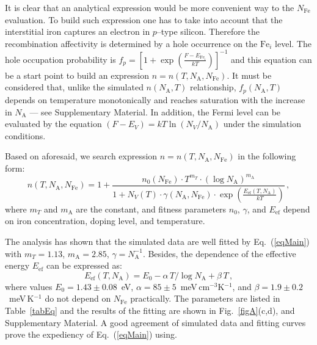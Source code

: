 \documentclass [sort&compress] {elsarticle}
\begin{document}
It is clear that an analytical expression would be more convenient way to the $N_\mathrm{Fe}$ evaluation.
To build such expression one has to take into account that the interstitial iron captures an electron in $p$--type silicon.
Therefore the recombination affectivity is determined by a hole occurrence  on the $\mathrm{Fe}_i$ level.
The hole occupation probability is $f_p=\left[1+\exp\left(\frac{F-E_{\mathrm{Fe}_i}}{kT}\right)\right]^{-1}$
and this equation can be a start point to build an expression $n=n(T,N_\mathrm{A},N_\mathrm{Fe})$.
It must be considered that, unlike the simulated  $n(N_\mathrm{A},T)$ relationship,
$f_p(N_\mathrm{A},T)$ depends on temperature monotonically and reaches saturation with the increase in $N_\mathrm{A}$ --- see Supplementary Material.
In addition, the Fermi level can be evaluated by the equation $(F-E_V)=kT\ln(N_V/N_\mathrm{A})$ under the simulation conditions.

Based on aforesaid, we search expression $n=n(T,N_\mathrm{A},N_\mathrm{Fe})$ in the following form:
\begin{equation}
\label{eqMain}
    n(T,N_\mathrm{A},N_\mathrm{Fe})=1+\frac{n_0(N_\mathrm{Fe})\cdot T^{m_T}\cdot(\log N_\mathrm{A})^{m_\mathrm{A}}}
        {1+N_V(T)\cdot\gamma(N_\mathrm{A},N_\mathrm{Fe})\cdot\exp\left(\frac{E_\mathrm{ef}(T,N_\mathrm{A})}{kT}\right)}\,,
\end{equation}
where
$m_T$ and $m_\mathrm{A}$ are the constant,
and fitness parameters $n_0$, $\gamma$, and $E_\mathrm{ef}$ depend on iron concentration, doping level, and temperature.

The analysis has shown that the simulated data are well fitted by Eq.~(\ref{eqMain}) with $m_T=1.13$, $m_\mathrm{A}=2.85$, $\gamma=N_\mathrm{A}^{-1}$.
Besides, the dependence of the effective energy $E_\mathrm{ef}$ can be expressed as:
\begin{equation}
\label{eqEf-FISRH}
    E_\mathrm{ef}(T,N_\mathrm{A})=E_0-\alpha\, T / \log N_\mathrm{A}+\beta \,T\,,
\end{equation}
where
values $E_0=1.43\pm0.08$~eV, $\alpha=85\pm5$~meV$\,$cm$^{-3}$K$^{-1}$, and $\beta=1.9\pm0.2$~meV$\,$K$^{-1}$ do not depend on $N_\mathrm{Fe}$ practically.
The parameters are listed in Table~\ref{tabEq} and the results of the fitting are shown in Fig.~\ref{figA}(c,d), and Supplementary Material.
A good agreement of  simulated data and fitting curves prove the expediency of Eq.~(\ref{eqMain}) using.
\end{document}
